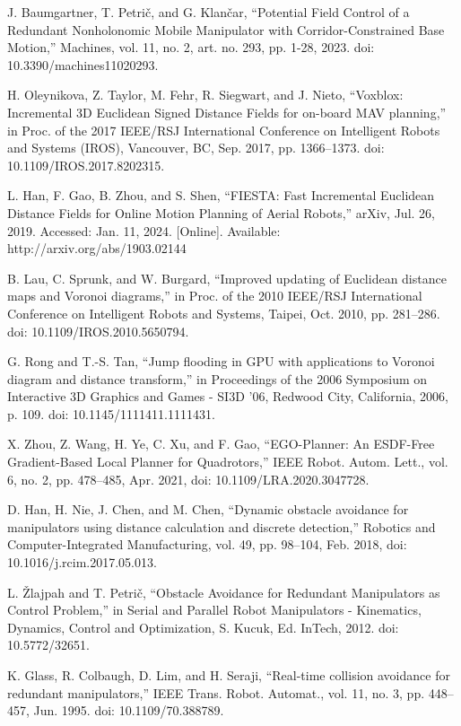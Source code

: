 \documentclass[letterpaper, 10 pt, conference]{ieeeconf}  %
\begin{document}
\begin{thebibliography}{99}
J. Baumgartner, T. Petrič, and G. Klančar, “Potential Field Control of a Redundant Nonholonomic Mobile Manipulator with Corridor-Constrained Base Motion,” Machines, vol. 11, no. 2, art. no. 293, pp. 1-28, 2023. doi: 10.3390/machines11020293.

 H. Oleynikova, Z. Taylor, M. Fehr, R. Siegwart, and J. Nieto, “Voxblox: Incremental 3D Euclidean Signed Distance Fields for on-board MAV planning,” in Proc. of the 2017 IEEE/RSJ International Conference on Intelligent Robots and Systems (IROS), Vancouver, BC, Sep. 2017, pp. 1366–1373. doi: 10.1109/IROS.2017.8202315.

 L. Han, F. Gao, B. Zhou, and S. Shen, “FIESTA: Fast Incremental Euclidean Distance Fields for Online Motion Planning of Aerial Robots,” arXiv, Jul. 26, 2019. Accessed: Jan. 11, 2024. [Online]. Available: http://arxiv.org/abs/1903.02144

 B. Lau, C. Sprunk, and W. Burgard, “Improved updating of Euclidean distance maps and Voronoi diagrams,” in Proc. of the 2010 IEEE/RSJ International Conference on Intelligent Robots and Systems, Taipei, Oct. 2010, pp. 281–286. doi: 10.1109/IROS.2010.5650794.

 G. Rong and T.-S. Tan, “Jump flooding in GPU with applications to Voronoi diagram and distance transform,” in Proceedings of the 2006 Symposium on Interactive 3D Graphics and Games - SI3D ’06, Redwood City, California, 2006, p. 109. doi: 10.1145/1111411.1111431.

 X. Zhou, Z. Wang, H. Ye, C. Xu, and F. Gao, “EGO-Planner: An ESDF-Free Gradient-Based Local Planner for Quadrotors,” IEEE Robot. Autom. Lett., vol. 6, no. 2, pp. 478–485, Apr. 2021, doi: 10.1109/LRA.2020.3047728.

 D. Han, H. Nie, J. Chen, and M. Chen, “Dynamic obstacle avoidance for manipulators using distance calculation and discrete detection,” Robotics and Computer-Integrated Manufacturing, vol. 49, pp. 98–104, Feb. 2018, doi: 10.1016/j.rcim.2017.05.013.

 L. Žlajpah and T. Petrič, “Obstacle Avoidance for Redundant Manipulators as Control Problem,” in Serial and Parallel Robot Manipulators - Kinematics, Dynamics, Control and Optimization, S. Kucuk, Ed. InTech, 2012. doi: 10.5772/32651.

 K. Glass, R. Colbaugh, D. Lim, and H. Seraji, “Real-time collision avoidance for redundant manipulators,” IEEE Trans. Robot. Automat., vol. 11, no. 3, pp. 448–457, Jun. 1995. doi: 10.1109/70.388789.


\end{thebibliography}
\end{document}
